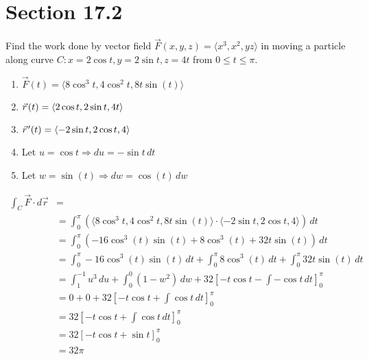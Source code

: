 \documentclass[letter,11pt]{article}
\newcommand{\pvec}[1]{\vec{#1}\mkern2mu\vphantom{#1}}
\begin{document}
\section*{Section 17.2} 
Find the work done by vector field $\vec{F}(x, y, z) = \langle x^3, x^2, yz \rangle$ in moving a particle along curve $C : x = 2\cos t, y = 2 \sin t, z = 4t$ from $0 \leq t \leq \pi$.
\begin{enumerate}[label = \roman*.]
    \item $\vec{F}(t)=\langle 8\cos^3 t,4\cos^{2}t,8t\sin\left(t\right)\rangle$
    \item $\pvec{r}(t)=\langle 2\cos t, 2 \sin t, 4t \rangle$
    \item $\pvec{r}'(t)=\langle -2\sin t, 2 \cos t, 4 \rangle$
    \item Let $u=\cos t\Longrightarrow du = -\sin t \, dt$
    \item Let $w=\sin(t) \Longrightarrow dw = \cos(t)\, dw$
\end{enumerate}
    \begin{align*}
        \int_{C}  \vec{F}  \cdot d\vec{r}  &= \\
        &= \int_{0}^{\pi}  \left(\langle  8\cos^3 t,4\cos^{2}t,8t\sin\left(t\right)\rangle  \cdot  \langle  -2\sin t, 2  \cos t, 4  \rangle  \right)  \, dt\\
        &= \int_{0}^{\pi}  \left(-16\cos^{3}\left(t\right)\sin\left(t\right)+8\cos^{3}\left(t\right)+32t\sin\left(t\right)\right)  \, dt\\
        &=\int_{0}^{\pi}-16\cos^{3}\left(t\right)\sin\left(t\right) \, dt + \int_{0}^{\pi}8\cos^{3}\left(t\right) \, dt + \int_{0}^{\pi} 32t\sin\left(t\right)  \, dt\\
        &= \int_{1}^{-1}u^3 \, du + \int_{0}^{0}(1-w^2)\, dw + 32\left[-t\cos t- \int -\cos t \, dt\right]_{0}^{\pi}\\
        &= 0+0+32\left[-t\cos t+\int \cos t \, dt\right]_{0}^{\pi}\\
        &=32\left[-t\cos t+\int \cos t \, dt\right]_{0}^{\pi}\\
        &=32\left[-t\cos t+\sin t\right]_{0}^{\pi}\\
        &= \boxed{32\pi}
        \end{align*}
\end{document}
